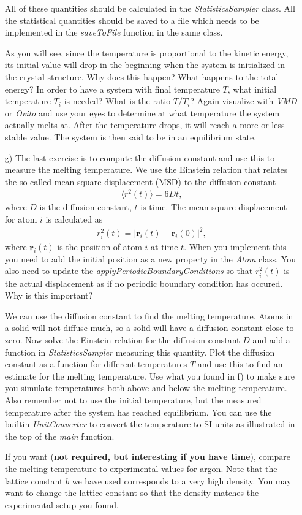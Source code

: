 \documentclass[11pt,a4wide]{article}
\renewcommand{\vec}{\mathbf}
\begin{document}
\begin{enumerate}
All of these quantities should be calculated in the \textit{StatisticsSampler} class. All the statistical quantities should be saved to a file which needs to be implemented in the \textit{saveToFile} function in the same class. 

As you will see, since the temperature is proportional to the kinetic energy, its initial value will drop in the beginning when the system is initialized in the crystal structure. Why does this happen? What happens to the total energy? In order to have a system with final temperature $T$, what initial temperature $T_i$ is needed? What is the ratio $T/T_i$? Again visualize with \textit{VMD} or \textit{Ovito} and use your eyes to determine at what temperature the system actually melts at. After the temperature drops, it will reach a more or less stable value. The system is then said to be in an equilibrium state.

\item[g)]
The last exercise is to compute the diffusion constant and use this to measure the melting temperature. We use the Einstein relation that relates the so called mean square displacement (MSD) to the diffusion constant
\begin{align}
	\langle r^2(t) \rangle = 6Dt,
\end{align}
where $D$ is the diffusion constant, $t$ is time. The mean square displacement for atom $i$ is calculated as
\begin{align}
	r_i^2(t) = |\vec r_i(t) - \vec r_i(0)|^2,
\end{align}
where $\vec r_i(t)$ is the position of atom $i$ at time $t$. When you implement this you need to add the initial position as a new property in the \textit{Atom} class. You also need to update the \textit{applyPeriodicBoundaryConditions} so that $r_i^2(t)$ is the actual displacement as if no periodic boundary condition has occured. Why is this important?

We can use the diffusion constant to find the melting temperature. Atoms in a solid will not diffuse much, so a solid will have a diffusion constant close to zero. Now solve the Einstein relation for the diffusion constant $D$ and add a function in \textit{StatisticsSampler} measuring this quantity. Plot the diffusion constant as a function for different temperatures $T$ and use this to find an estimate for the melting temperature. Use what you found in f) to make sure you simulate temperatures both above and below the melting temperature. Also remember not to use the initial temperature, but the measured temperature after the system has reached equilibrium. You can use the builtin \textit{UnitConverter} to convert the temperature to SI units as illustrated in the top of the \textit{main} function. 

If you want (\textbf{not required, but interesting if you have time}), compare the melting temperature to experimental values for argon. Note that the lattice constant $b$ we have used corresponds to a very high density. You may want to change the lattice constant so that the density matches the experimental setup you found. 

\end{enumerate}
\end{document}
